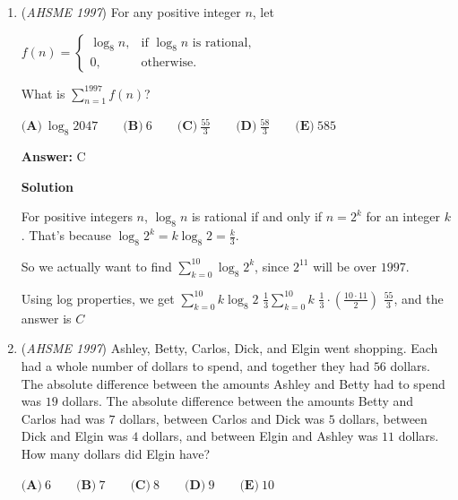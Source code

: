 \begin{enumerate}
\textbf{Solution}

Notice how the sum of 100 consecutive integers is $(x-49)+(x-48)+(x-47)...+x+...(x+47)+(x+48)+(x+49)+(x+50)$. 

 Cancelling out the constants give us $100x + 50$. 

 Looking over at the list of possible values, we quickly realise that the only possible solution is $\boxed{A}$



	\item (\textit{AHSME 1997}) For any positive integer $n$, let 


 $f(n) =\left\{\begin{matrix}\log_{8}{n}, &\text{if }\log_{8}{n}\text{ is rational,}\\ 0, &\text{otherwise.}\end{matrix}\right.$


 What is $\sum_{n = 1}^{1997}{f(n)}$?


 $\textbf{(A)}\ \log_{8}{2047}\qquad\textbf{(B)}\ 6\qquad\textbf{(C)}\ \frac{55}{3}\qquad\textbf{(D)}\ \frac{58}{3}\qquad\textbf{(E)}\ 585$

 \textbf{Answer: }C



\textbf{Solution}

For positive integers $n$, $\log_8 n$ is rational if and only if $n = 2^k$ for an integer $k$.  That's because $\log_8 2^k = k\log_8 2 = \frac{k}{3}$.

 So we actually want to find $\sum_{k=0}^{10} \log_8 2^k$, since $2^{11}$ will be over $1997$.

 Using log properties, we get $\sum_{k=0}^{10} k \log_8 2$
$\frac{1}{3}\sum_{k=0}^{10} k$
$\frac{1}{3}\cdot (\frac{10\cdot 11}{2})$
$\frac{55}{3}$, and the answer is $\boxed{C}$



	\item (\textit{AHSME 1997}) Ashley, Betty, Carlos, Dick, and Elgin went shopping. Each had a whole number of dollars to spend, and together they had $56$ dollars. The absolute difference between the amounts Ashley and Betty had to spend was $19$ dollars. The absolute difference between the amounts Betty and Carlos had was $7$ dollars, between Carlos and Dick was $5$ dollars, between Dick and Elgin was $4$ dollars, and between Elgin and Ashley was $11$ dollars. How many dollars did Elgin have?


 $\textbf{(A)}\ 6\qquad\textbf{(B)}\ 7\qquad\textbf{(C)}\ 8\qquad\textbf{(D)}\ 9\qquad\textbf{(E)}\ 10$


\end{enumerate}
